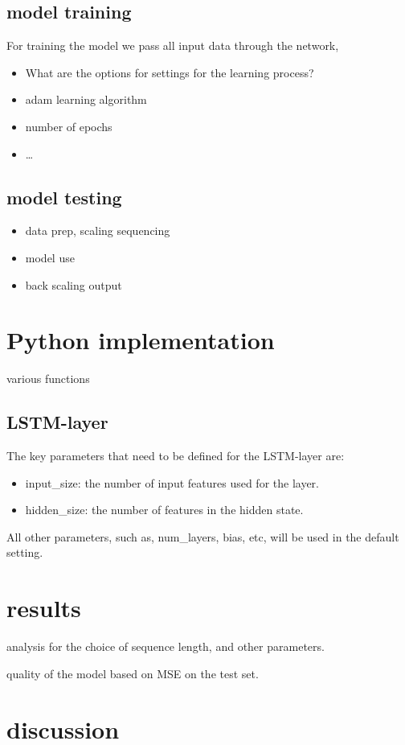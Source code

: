 \subsection{model training}
For training the model we pass all input data through the network, 

\begin{itemize}
\item What are the options for settings for the learning process?
\item adam learning algorithm
\item number of epochs
\item \ldots
\end{itemize}

\subsection{model testing}
\begin{itemize}
\item data prep, scaling \+ sequencing
\item model use
\item back scaling output
\end{itemize}


\section{Python implementation}
 various functions

\subsection{LSTM-layer}
The key parameters that need to be defined for the LSTM-layer are:
\begin{itemize}
\item input_size: the number of input features used for the layer.
\item hidden_size: the number of features in the hidden state.
\end{itemize}
All other parameters, such as, num_layers, bias, etc, will be used in the default setting. 





\section{results}
analysis for the choice of sequence length, and other parameters.

quality of the model based on MSE on the test set. 




\section{discussion}


%



